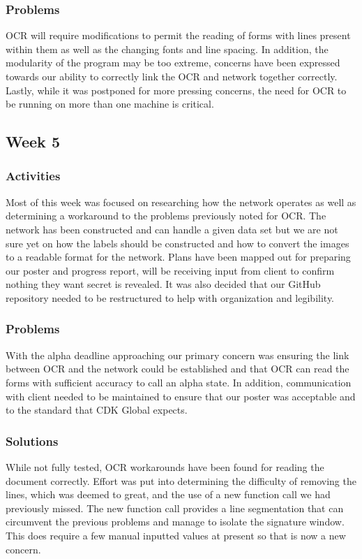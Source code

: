 \documentclass[onecolumn, draftclsnofoot,10pt, compsoc]{IEEEtran}
\begin{document}
\subsubsection{Problems}
OCR will require modifications to permit the reading of forms with lines present within them as well as the changing fonts and line spacing. In addition, the modularity of the program may be too extreme, concerns have been expressed towards our ability to correctly link the OCR and network together correctly. Lastly, while it was postponed for more pressing concerns, the need for OCR to be running on more than one machine is critical.

\subsection{Week 5}
\subsubsection{Activities}
Most of this week was focused on researching how the network operates as well as determining a workaround to the problems previously noted for OCR. The network has been constructed and can handle a given data set but we are not sure yet on how the labels should be constructed and how to convert the images to a readable format for the network. Plans have been mapped out for preparing our poster and progress report, will be receiving input from client to confirm nothing they want secret is revealed. It was also decided that our GitHub repository needed to be restructured to help with organization and legibility. 

\subsubsection{Problems}
With the alpha deadline approaching our primary concern was ensuring the link between OCR and the network could be established and that OCR can read the forms with sufficient accuracy to call an alpha state. In addition, communication with client needed to be maintained to ensure that our poster was acceptable and to the standard that CDK Global expects. 

\subsubsection{Solutions}
While not fully tested, OCR workarounds have been found for reading the document correctly. Effort was put into determining the difficulty of removing the lines, which was deemed to great, and the use of a new function call we had previously missed. The new function call provides a line segmentation that can circumvent the previous problems and manage to isolate the signature window. This does require a few manual inputted values at present so that is now a new concern.
\end{document}
